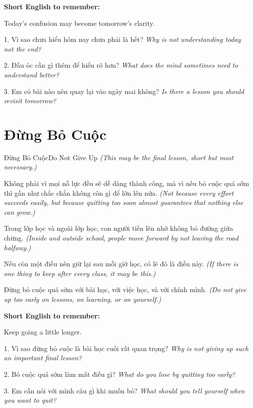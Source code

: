 \begin{ghinhoanh}
\textbf{Short English to remember:}

Today's confusion may become tomorrow's clarity.

\end{ghinhoanh}

\begin{tuhocnhanh}
1. Vì sao chưa hiểu hôm nay chưa phải là hết? \textit{Why is not understanding today not the end?}

2. Đầu óc cần gì thêm để hiểu rõ hơn? \textit{What does the mind sometimes need to understand better?}

3. Em có bài nào nên quay lại vào ngày mai không? \textit{Is there a lesson you should revisit tomorrow?}
\end{tuhocnhanh}
\ngancach

\section{Đừng Bỏ Cuộc}
\begin{truyen}{Đừng Bỏ Cuộc}{Do Not Give Up}
\textit{(This may be the final lesson, short but most necessary.)}

Không phải vì mọi nỗ lực đều sẽ dễ dàng thành công, mà vì nếu bỏ cuộc quá sớm thì gần như chắc chắn không còn gì để lớn lên nữa.
\textit{(Not because every effort succeeds easily, but because quitting too soon almost guarantees that nothing else can grow.)}

Trong lớp học và ngoài lớp học, con người tiến lên nhờ không bỏ đường giữa chừng.
\textit{(Inside and outside school, people move forward by not leaving the road halfway.)}

Nếu còn một điều nên giữ lại sau mỗi giờ học, có lẽ đó là điều này.
\textit{(If there is one thing to keep after every class, it may be this.)}
\end{truyen}

\begin{baihoc}
Đừng bỏ cuộc quá sớm với bài học, với việc học, và với chính mình.
\textit{(Do not give up too early on lessons, on learning, or on yourself.)}
\end{baihoc}

\begin{ghinhoanh}
\textbf{Short English to remember:}

Keep going a little longer.

\end{ghinhoanh}

\begin{tuhocnhanh}
1. Vì sao đừng bỏ cuộc là bài học cuối rất quan trọng? \textit{Why is not giving up such an important final lesson?}

2. Bỏ cuộc quá sớm làm mất điều gì? \textit{What do you lose by quitting too early?}

3. Em cần nói với mình câu gì khi muốn bỏ? \textit{What should you tell yourself when you want to quit?}
\end{tuhocnhanh}
\ngancach